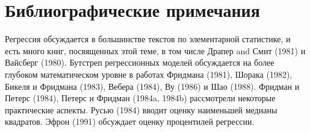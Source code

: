 \section{Библиографические примечания}

Регрессия обсуждается в большинстве текстов по элементарной статистике, и есть много книг, посвященных этой теме, в том числе Драпер and Смит (1981) и Вайсберг (1980). Бутстреп регрессионных моделей обсуждается на более глубоком математическом уровне в работах Фридмана (1981), Шорака (1982), Бикеля и Фридмана (1983), Вебера (1984), Ву (1986) и Шао (1988). Фридман и Петерс (1984), Петерс и Фридман (1984a, 1984b) рассмотрели некоторые практические аспекты. Русью (1984) вводит оценку наименьшей медианы квадратов. Эфрон (1991) обсуждает оценку процентилей регрессии.